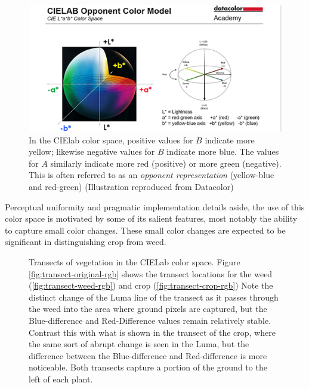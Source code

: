 \documentclass[letterpaper]{report}
\begin{document}
\begin{figure}[H]
	\centering
	\includegraphics[width=.65\linewidth]{./figures/cielab-colorspace.png}
	\caption[CIElab color space]{In the CIElab color space, positive values for $B$ indicate more yellow; likewise negative values for $B$ indicate more blue. The values for $A$ similarly indicate more red (positive) or more green (negative). This is often referred to as an \textit{opponent representation} (yellow-blue and red-green) (Illustration reproduced from Datacolor)}
	\label{fig:cielab}	
\end{figure}

Perceptual uniformity and pragmatic implementation details aside, the use of this color space is motivated by some of its salient features, most notably the ability to capture small color changes. These small color changes are expected to be significant in distinguishing crop from weed.

\begin{figure}[h]
	\centering
	\hfill
	\hfill
	\caption[CIELab Transects]{Transects of vegetation in the CIELab color space. Figure \ref{fig:transect-original-rgb} shows the transect locations for the weed (\ref{fig:transect-weed-rgb}) and crop (\ref{fig:transect-crop-rgb}) Note the distinct change of the Luma line of the transect as it passes through the weed into the area where ground pixels are captured, but the Blue-difference and Red-Difference values remain relatively stable. Contrast this with what is shown in the transect of the crop, where the same sort of abrupt change is seen in the Luma, but the difference between the Blue-difference and Red-difference is more noticeable. Both transects capture a portion of the ground to the left of each plant.}
	\label{fig:transects-cielab}
\end{figure}
\end{document}
